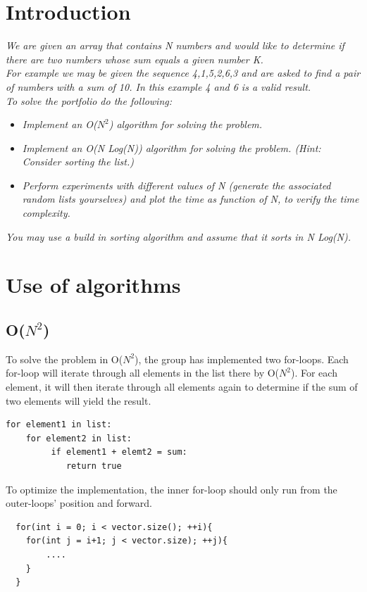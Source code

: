 \section{Introduction}
\emph{We are given an array that contains N numbers and would like to determine if there are two numbers whose sum equals a given number K.\\
For example we may be given the sequence 4,1,5,2,6,3 and are asked to find a pair of numbers with a sum of 10. In this example 4 and 6 is a valid result.\\
To solve the portfolio do the following:}
\begin{itemize}
\item \emph{Implement an O(\(N^{2}\)) algorithm for solving the problem.}
\item \emph{Implement an O(N Log(N)) algorithm for solving the problem. (Hint: Consider sorting the list.)}
\item \emph{Perform experiments with different values of N (generate the associated random lists yourselves)
and plot the time as function of N, to verify the time complexity.}
\end{itemize}
\emph{You may use a build in sorting algorithm and assume that it sorts in N Log(N).}

\section{Use of algorithms}
\subsection{O(\(N^{2}\))}
To solve the problem in O(\(N^{2}\)), the group has implemented two for-loops. Each for-loop will iterate through all elements in the list there by O(\(N^{2}\)). For each element, it will then iterate through all elements again to determine if the sum of two elements will yield the result.
\begin{lstlisting}
for element1 in list:
    for element2 in list:
         if element1 + elemt2 = sum:
            return true
\end{lstlisting}
To optimize the implementation, the inner for-loop should only run from the outer-loops' position and forward.
\begin{lstlisting}
  for(int i = 0; i < vector.size(); ++i){
  	for(int j = i+1; j < vector.size); ++j){
  		....
  	}
  }
\end{lstlisting}

